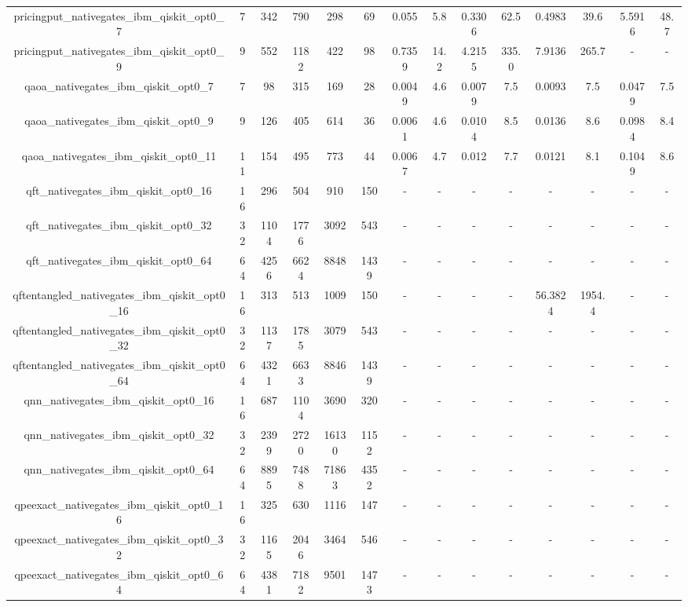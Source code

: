 \begin{table}[htb]
{\begin{tabular}{|c|c|c|c|c|c|c|c|c|c|c|c|c|c|}
pricingput\_nativegates\_ibm\_qiskit\_opt0\_7 & 7 & 342 & 790 & 298 & 69 & 0.055 & 5.8 & 0.3306 & 62.5 & 0.4983 & 39.6 & 5.5916 & 48.7 \\ 
pricingput\_nativegates\_ibm\_qiskit\_opt0\_9 & 9 & 552 & 1182 & 422 & 98 & 0.7359 & 14.2 & 4.2155 & 335.0 & 7.9136 & 265.7 & - & - \\ 
qaoa\_nativegates\_ibm\_qiskit\_opt0\_7 & 7 & 98 & 315 & 169 & 28 & 0.0049 & 4.6 & 0.0079 & 7.5 & 0.0093 & 7.5 & 0.0479 & 7.5 \\ 
qaoa\_nativegates\_ibm\_qiskit\_opt0\_9 & 9 & 126 & 405 & 614 & 36 & 0.0061 & 4.6 & 0.0104 & 8.5 & 0.0136 & 8.6 & 0.0984 & 8.4 \\ 
qaoa\_nativegates\_ibm\_qiskit\_opt0\_11 & 11 & 154 & 495 & 773 & 44 & 0.0067 & 4.7 & 0.012 & 7.7 & 0.0121 & 8.1 & 0.1049 & 8.6 \\ 
qft\_nativegates\_ibm\_qiskit\_opt0\_16 & 16 & 296 & 504 & 910 & 150 & - & - & - & - & - & - & - & - \\ 
qft\_nativegates\_ibm\_qiskit\_opt0\_32 & 32 & 1104 & 1776 & 3092 & 543 & - & - & - & - & - & - & - & - \\ 
qft\_nativegates\_ibm\_qiskit\_opt0\_64 & 64 & 4256 & 6624 & 8848 & 1439 & - & - & - & - & - & - & - & - \\ 
qftentangled\_nativegates\_ibm\_qiskit\_opt0\_16 & 16 & 313 & 513 & 1009 & 150 & - & - & - & - & 56.3824 & 1954.4 & - & - \\ 
qftentangled\_nativegates\_ibm\_qiskit\_opt0\_32 & 32 & 1137 & 1785 & 3079 & 543 & - & - & - & - & - & - & - & - \\ 
qftentangled\_nativegates\_ibm\_qiskit\_opt0\_64 & 64 & 4321 & 6633 & 8846 & 1439 & - & - & - & - & - & - & - & - \\ 
qnn\_nativegates\_ibm\_qiskit\_opt0\_16 & 16 & 687 & 1104 & 3690 & 320 & - & - & - & - & - & - & - & - \\ 
qnn\_nativegates\_ibm\_qiskit\_opt0\_32 & 32 & 2399 & 2720 & 16130 & 1152 & - & - & - & - & - & - & - & - \\ 
qnn\_nativegates\_ibm\_qiskit\_opt0\_64 & 64 & 8895 & 7488 & 71863 & 4352 & - & - & - & - & - & - & - & - \\ 
qpeexact\_nativegates\_ibm\_qiskit\_opt0\_16 & 16 & 325 & 630 & 1116 & 147 & - & - & - & - & - & - & - & - \\ 
qpeexact\_nativegates\_ibm\_qiskit\_opt0\_32 & 32 & 1165 & 2046 & 3464 & 546 & - & - & - & - & - & - & - & - \\ 
qpeexact\_nativegates\_ibm\_qiskit\_opt0\_64 & 64 & 4381 & 7182 & 9501 & 1473 & - & - & - & - & - & - & - & - \\ 

\end{tabular}}
\end{table}
